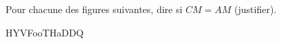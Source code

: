 
\begin{exercice}\label{exo2smath-0221}

    Pour chacune des figures suivantes, dire si \( CM=AM\) (justifier).
            
HYVFooTHaDDQ


\end{exercice}
